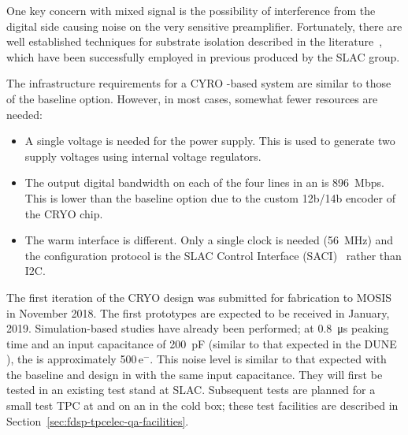 One key concern with mixed signal  is the possibility of interference from the digital side causing noise on the very sensitive preamplifier. 
Fortunately, there are well established techniques for substrate isolation described in the literature~\cite{yeh}, which have been successfully employed in previous  produced by the SLAC group.%


The infrastructure requirements for a CYRO -based system are similar to those of the baseline option. However, in most cases, somewhat fewer resources are needed:
\begin{itemize}
\item{A single voltage is needed for the power supply. This is used to generate two supply voltages using internal voltage regulators.}
\item{The output digital bandwidth on each of the four lines in an  is \SI{896}{Mbps}. This is lower than the baseline option due to the custom 12b/14b encoder of the CRYO chip. }
\item{The warm interface is different. Only a single clock is needed (\SI{56}{MHz}) and the configuration protocol is the SLAC  Control Interface (SACI)~\cite{SACI} rather than I2C.}
\end{itemize}

The first iteration of the CRYO  design was submitted for fabrication to MOSIS in November 2018.  The first prototypes are expected to be received in January, 2019. Simulation-based studies have already been performed; at \SI{0.8}{\micro\second} peaking time and an input capacitance of \SI{200}{pF} (similar to that expected in the DUNE ), the  is approximately \num{500}\,e$^-$.  This noise level is similar to that expected with the baseline  and   design in \lar with the same input capacitance.  They will first be tested in an existing test stand at SLAC.  Subsequent tests are planned for a small test TPC at \fnal and on an  in the  cold box; these test facilities are described in Section~\ref{sec:fdsp-tpcelec-qa-facilities}.

